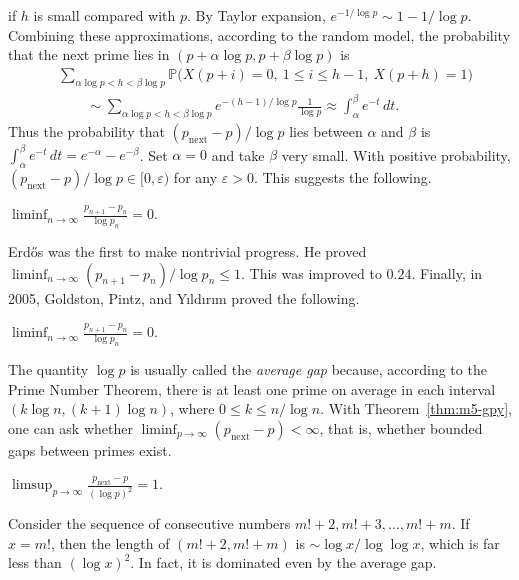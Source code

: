 \documentclass[11pt,a4paper]{article}
\begin{document}
if $h$ is small compared with $p$.
By Taylor expansion, $e^{-1/\log p}\sim1-1/\log p$.
Combining these approximations, according to the random
model, the probability that the next prime lies in
$(p+\alpha\log p,p+\beta\log p)$ is
\[
 \begin{aligned}
 &\sum_{\alpha\log p<h<\beta\log p}
 \mathbb P\bigl(X(p+i)=0,\ 1\le i\le h-1,\ X(p+h)=1\bigr)\\
 &\qquad\sim
 \sum_{\alpha\log p<h<\beta\log p}
 e^{-(h-1)/\log p}\frac1{\log p}
 \approx\int_\alpha^\beta e^{-t}\,dt.
 \end{aligned}
\]
Thus the probability that $(p_{\mathrm{next}}-p)/\log p$ lies between
$\alpha$ and $\beta$ is
$\int_\alpha^\beta e^{-t}\,dt=e^{-\alpha}-e^{-\beta}$.
Set $\alpha=0$ and take $\beta$ very small.
With positive probability, $(p_{\mathrm{next}}-p)/\log p\in[0,\varepsilon)$
for any $\varepsilon>0$. This suggests the following.
\setcounter{theorem}{18}\begin{conjecture}
$\displaystyle\liminf_{n\to\infty}\frac{p_{n+1}-p_n}{\log p_n}=0$.
\end{conjecture}
Erd\H{o}s was the first to make nontrivial progress. He proved
$\liminf_{n\to\infty}(p_{n+1}-p_n)/\log p_n\le1$.
This was improved to $0.24$. Finally, in 2005, Goldston, Pintz, and
Y{\i}ld{\i}r{\i}m proved the following.
\setcounter{theorem}{19}\begin{theorem}
\label{thm:m5-gpy}
$\displaystyle\liminf_{n\to\infty}\frac{p_{n+1}-p_n}{\log p_n}=0$.
\end{theorem}
The quantity $\log p$ is usually called the \emph{average gap} because,
according to the Prime Number Theorem, there is at least one prime on
average in each interval
$(k\log n,(k+1)\log n)$, where $0\le k\le n/\log n$.
With Theorem~\ref{thm:m5-gpy}, one can ask whether
$\liminf_{p\to\infty}(p_{\mathrm{next}}-p)<\infty$, that is, whether
bounded gaps between primes exist.


\setcounter{theorem}{20}\begin{conjecture}
$\displaystyle\limsup_{p\to\infty}
\frac{p_{\mathrm{next}}-p}{(\log p)^2}=1$.
\end{conjecture}
Consider the sequence of consecutive numbers $m!+2,m!+3,\ldots,m!+m$.
If $x=m!$, then the length of $(m!+2,m!+m)$ is
$\sim\log x/\log\log x$, which is far less than $(\log x)^2$.
In fact, it is dominated even by the average gap.
\end{document}
